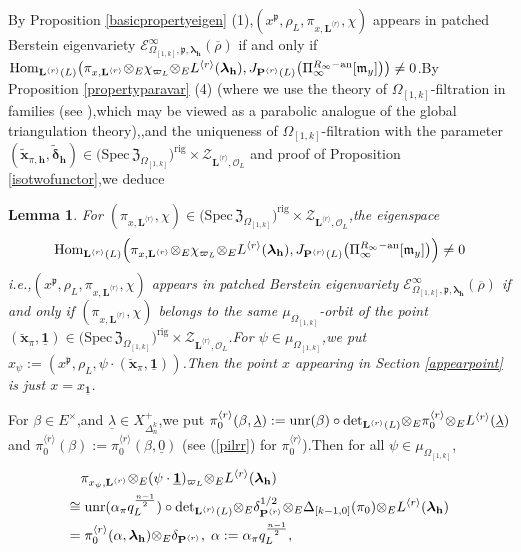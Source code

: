 \documentclass[SecEq,CM,GP]{degruyter-crelle} %
\theoremstyle{plain}
\newtheorem{lem}[thm]{Lemma}
\newcommand{\ana}{{\rm an}}
\newcommand{\bersteineigenvarpik}{{\mathcal{E}_{\omepik,\fp,\bm{\lambda}_\bh}^\infty(\overline{\rho})}}
\newcommand{\homo}{{\rm Hom}}
\newcommand{\lamoverx}{{L^{\lrr}({\bm\lambda}_\bh)}}
\newcommand{\lrr}{{\langle r\rangle}}
\newcommand{\omepik}{\Omega_{[1,k]}}
\newcommand{\rigch}{{\mathcal{Z}_{\bL^{\lrr},\mathcal{O}_L}}}
\newcommand{\sbanpik}{{\big(\mathrm{Spec}\hspace{2pt}\mathfrak{Z}_{\omepik}\big)^{\mathrm{rig}}}}
\newcommand{\te}{{\otimes_E}}
\newcommand{\unr}{{\rm unr}}
\newcommand{\bL}{{\mathbf{L}}}
\newcommand{\bP}{{\mathbf{P}}}
\newcommand{\bx}{{\mathbf{x}}}
\newcommand{\bh}{{\mathbf{h}}}
\newcommand{\fm}{{\mathfrak{m}}}
\newcommand{\fp}{{\mathfrak{p}}}
\begin{document}
By Proposition \ref{basicpropertyeigen} (1),\;$(x^{\fp}, \rho_L, \pi_{x,\bL^{\lrr}},\chi)$ appears in patched Berstein eigenvariety $\bersteineigenvarpik$ if and only if $\homo_{\bL^{\lrr}(L)}\big(\pi_{x,\bL^{\lrr}}\te\chi_{\varpi_L}\te \lamoverx, J_{\bP^{\lrr}(L)}\big(\Pi_{\infty}^{R_{\infty}-\ana}[\fm_y]\big)\big)\neq0$.\;By Proposition \ref{propertyparavar} (4) (where we use the theory of $\omepik$-filtration in families (see \cite[Appendix A.1]{Ding2021}),\;which may be viewed as a parabolic analogue of the global triangulation theory),\;\cite[Corollary 3.1.11]{Ding2021},\;and the uniqueness of $\omepik$-filtration with the parameter $(\widetilde{\bx}_{\pi,\bh},\widetilde{\bm{\delta}}_\bh)\in \sbanpik\times\rigch $ and proof of Proposition \ref{isotwofunctor},\;we deduce
\begin{lem}\label{detlameda}
For $(\pi_{x,\bL^{\lrr}},\chi)\in \sbanpik\times\rigch $,\;the eigenspace
\[\homo_{\bL^{\lrr}(L)}\Big(\pi_{x,\bL^{\lrr}}\te\chi_{\varpi_L}\te \lamoverx, J_{\bP^{\lrr}(L)}\big(\Pi_{\infty}^{R_{\infty}-\ana}[\fm_y]\big)\Big)\neq0\]
i.e.,\;$(x^{\fp}, \rho_L, \pi_{x,\bL^{\lrr}},\chi)$ appears in patched Berstein eigenvariety $\bersteineigenvarpik$ if and only if
$(\pi_{x,\bL^{\lrr}},\chi)$ belongs to the same $\mu_{\omepik}$-orbit of the point $(\breve{\mathbf{{x}}}_\pi,\underline{\mathbf{1}})\in \sbanpik\times\rigch $.\;For $\psi\in \mu_{\omepik}$,\;we put $x_{\psi}:=(x^{\fp}, \rho_L,{\psi}\cdot(\breve{\mathbf{{x}}}_\pi,\underline{\mathbf{1}}))$.\;Then the point $x$ appearing in Section \ref{appearpoint} is just $x=x_{\underline{\mathbf{1}}}$.\;
\end{lem}
For $\beta\in E^\times$,\;and $\underline{\lambda}\in X^+_{\Delta_n^k}$,\;we put $\pi_0^{\lrr}(\beta,\underline{\lambda}):=\unr(\beta)\circ\mathrm{det}_{\bL^{\lrr}(L)}\te \pi_0^{\lrr}\te L^{\lrr}(\underline{\lambda})$ and $\pi_0^{\lrr}(\beta):=\pi_0^{\lrr}(\beta,\underline{0})$ (see (\ref{pilrr}) for $\pi_0^{\lrr}$).\;Then for all $\psi\in \mu_{\omepik}$,
\begin{equation}
\begin{aligned}
	&\pi_{x_{\psi},\bL^{\lrr}}\te (\psi\cdot \underline{\mathbf{1}})_{\varpi_L}\te \lamoverx\\
	\cong &\;\unr(\alpha_\pi  q_L^{\frac{n-1}{2}})\circ\mathrm{det}_{\bL^{\lrr}(L)}\te \delta_{\bP^{\lrr}}^{1/2}\te\Delta_{[k-1,0]}(\pi_0)\te \lamoverx\\
	=&\;\pi_0^{\lrr}(\alpha,{\bm\lambda}_\bh)\te \delta_{\bP^{\lrr}},\;\alpha:=\alpha_\pi  q_L^{\frac{n-1}{2}},
\end{aligned}
\end{equation}
\end{document}
